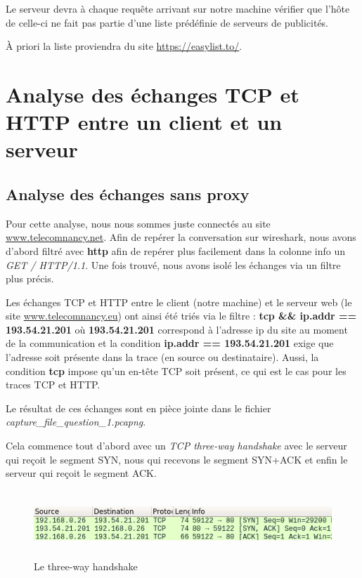 \documentclass[12 pt,a4paper,frenchb]{article}
\begin{document}
Le serveur devra à chaque requête arrivant sur notre machine vérifier que l'hôte de celle-ci ne fait pas partie d'une liste prédéfinie de serveurs de publicités.

À priori la liste proviendra du site \url{https://easylist.to/}.

\section{Analyse des échanges TCP et HTTP entre un client et un serveur}

\subsection{Analyse des échanges sans proxy}

Pour cette analyse, nous nous sommes juste connectés au site \url{www.telecomnancy.net}. Afin de repérer la conversation sur wireshark, nous avons d'abord filtré avec \textbf{http} afin de repérer plus facilement dans la colonne info un \textit{GET / HTTP/1.1}. Une fois trouvé, nous avons isolé les échanges via un filtre plus précis.

Les échanges TCP et HTTP entre le client (notre machine) et le serveur web (le site \url{www.telecomnancy.eu}) ont ainsi été triés via le filtre : \textbf{tcp \&\& ip.addr == 193.54.21.201} où \textbf{193.54.21.201} correspond à l'adresse ip du site au moment de la communication et la condition \textbf{ip.addr == 193.54.21.201} exige que l'adresse soit présente dans la trace (en source ou destinataire). Aussi, la condition \textbf{tcp} impose qu'un en-tête TCP soit présent, ce qui est le cas pour les traces TCP et HTTP.

Le résultat de ces échanges sont en pièce jointe dans le fichier 
\og\textit{capture\_file\_question\_1.pcapng}\fg.

Cela commence tout d'abord avec un \textit{TCP three-way handshake} avec le serveur qui reçoit le segment SYN, nous qui recevons le segment SYN+ACK et enfin le serveur qui reçoit le segment ACK.

\begin{figure}[h]
  \centering
  \includegraphics[height=2.5cm,width=15cm]{Q1/three_way_handshake.png}
  \caption{Le three-way handshake}
\end{figure}
\vspace{1cm}
\end{document}
